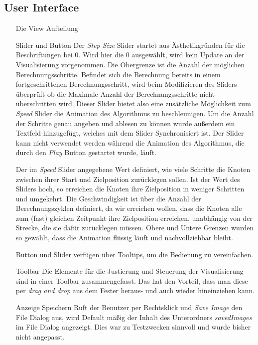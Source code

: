 \subsection*{User Interface}
\begin{enumerate}
    \item[Die View] Aufteilung
    \item[Slider und Button] Der \textit{Step Size} Slider startet aus Ästhetikgründen für die Beschriftungen bei 0. Wird hier die 0 ausgewählt, wird kein Update an der Visualisierung vorgenommen. Die Obergrenze ist die Anzahl der möglichen  Berechnungsschritte. Befindet sich die Berechnung bereits in einem fortgeschrittenen Berechnungsschritt, wird beim Modifizieren des Sliders überprüft ob die Maximale Anzahl der Berechnungsschritte nicht überschritten wird. Dieser Slider bietet also eine zusätzliche Möglichkeit zum \textit{Speed} Slider die Animation des Algorithmus zu beschleunigen. Um die Anzahl der Schritte genau angeben und ablesen zu können wurde außerdem ein Textfeld hinzugefügt, welches mit dem Slider Synchronisiert ist. Der Slider kann nicht verwendet werden während die Animation des Algorithmus, die durch den \textit{Play} Button gestartet wurde, läuft. 
    
    Der im \textit{Speed} Slider angegebene Wert definiert, wie viele Schritte die Knoten zwischen ihrer Start und Zielposition zurücklegen sollen. Ist der Wert des Sliders hoch, so erreichen die Knoten ihre Zielposition in weniger Schritten und umgekehrt. Die Geschwindigkeit ist über die Anzahl der Berechnungszyklen definiert, da wir erreichen wollen, dass die  Knoten alle zum (fast) gleichen Zeitpunkt ihre Zielposition erreichen, unabhängig von der Strecke, die sie dafür zurücklegen müssen. Obere und Untere Grenzen wurden so gewählt, dass die Animation flüssig läuft und nachvollziehbar bleibt.
    
    Button und Slider verfügen über Tooltips, um die Bedienung zu vereinfachen.
    
    \item[Toolbar] Die Elemente für die Justierung und Steuerung der Visualisierung sind in einer Toolbar zusammengefasst. Das hat den Vorteil, dass man diese per \textit{drag and drop} aus dem Fester heraus- und auch wieder hineinziehen kann.
    
    \item[Anzeige Speichern] Ruft der Benutzer per Rechtsklick und \textit{Save Image} den File Dialog aus, wird Default mäßig der Inhalt des Unterordners \textit{savedImages} im File Dialog angezeigt. Dies war zu Testzwecken sinnvoll und wurde bisher nicht angepasst.
\end{enumerate}


